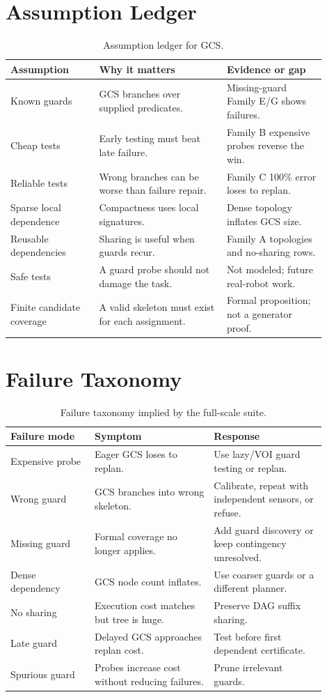 \documentclass{article}
\begin{document}
\section{Assumption Ledger}
\begin{table}[p]
\centering
\caption{Assumption ledger for GCS.}
\label{tab:assumptions}
\small
\begin{tabular}{p{0.25\linewidth}p{0.36\linewidth}p{0.29\linewidth}}
\toprule
Assumption & Why it matters & Evidence or gap \\
\midrule
Known guards & GCS branches over supplied predicates. & Missing-guard Family E/G shows failures.\\
Cheap tests & Early testing must beat late failure. & Family B expensive probes reverse the win.\\
Reliable tests & Wrong branches can be worse than failure repair. & Family C 100\% error loses to replan.\\
Sparse local dependence & Compactness uses local signatures. & Dense topology inflates GCS size.\\
Reusable dependencies & Sharing is useful when guards recur. & Family A topologies and no-sharing rows.\\
Safe tests & A guard probe should not damage the task. & Not modeled; future real-robot work.\\
Finite candidate coverage & A valid skeleton must exist for each assignment. & Formal proposition; not a generator proof.\\
\bottomrule
\end{tabular}
\end{table}

\section{Failure Taxonomy}
\begin{table}[p]
\centering
\caption{Failure taxonomy implied by the full-scale suite.}
\label{tab:failure-taxonomy}
\small
\begin{tabular}{p{0.24\linewidth}p{0.34\linewidth}p{0.32\linewidth}}
\toprule
Failure mode & Symptom & Response \\
\midrule
Expensive probe & Eager GCS loses to replan. & Use lazy/VOI guard testing or replan.\\
Wrong guard & GCS branches into wrong skeleton. & Calibrate, repeat with independent sensors, or refuse.\\
Missing guard & Formal coverage no longer applies. & Add guard discovery or keep contingency unresolved.\\
Dense dependency & GCS node count inflates. & Use coarser guards or a different planner.\\
No sharing & Execution cost matches but tree is huge. & Preserve DAG suffix sharing.\\
Late guard & Delayed GCS approaches replan cost. & Test before first dependent certificate.\\
Spurious guard & Probes increase cost without reducing failures. & Prune irrelevant guards.\\
\bottomrule
\end{tabular}
\end{table}
\end{document}
